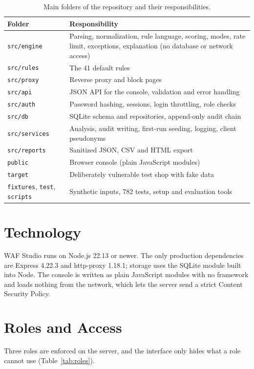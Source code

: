 \documentclass{FastFyp}
\begin{document}
\begin{table}[!h]
\centering
\caption{Main folders of the repository and their responsibilities.}
{\small\singlespacing\renewcommand{\arraystretch}{1.3}
\begin{tabular}{|p{4.9cm}|p{8.6cm}|}
\hline
\textbf{Folder} & \textbf{Responsibility} \\
\hline
\texttt{src/engine} & Parsing, normalization, rule language, scoring, modes, rate limit, exceptions, explanation (no database or network access) \\
\hline
\texttt{src/rules} & The 41 default rules \\
\hline
\texttt{src/proxy} & Reverse proxy and block pages \\
\hline
\texttt{src/api} & JSON API for the console, validation and error handling \\
\hline
\texttt{src/auth} & Password hashing, sessions, login throttling, role checks \\
\hline
\texttt{src/db} & SQLite schema and repositories, append-only audit chain \\
\hline
\texttt{src/services} & Analysis, audit writing, first-run seeding, logging, client pseudonyms \\
\hline
\texttt{src/reports} & Sanitized JSON, CSV and HTML export \\
\hline
\texttt{public} & Browser console (plain JavaScript modules) \\
\hline
\texttt{target} & Deliberately vulnerable test shop with fake data \\
\hline
\texttt{fixtures}, \texttt{test}, \texttt{scripts} & Synthetic inputs, 782 tests, setup and evaluation tools \\
\hline
\end{tabular}}
\label{tab:folders}
\end{table}

\section{Technology}
WAF Studio runs on Node.js 22.13 or newer. The only production dependencies are Express 4.22.3 and http-proxy 1.18.1; storage uses the SQLite module built into Node. The console is written as plain JavaScript modules with no framework and loads nothing from the network, which lets the server send a strict Content Security Policy.

\section{Roles and Access}
Three roles are enforced on the server, and the interface only hides what a role cannot use (Table~\ref{tab:roles}).
\end{document}
